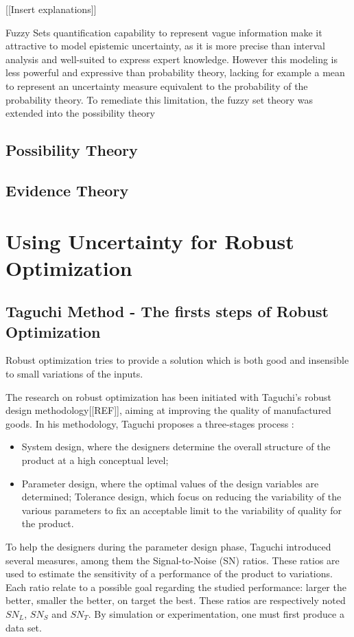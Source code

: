 [[Insert explanations]]

Fuzzy Sets quantification capability to represent vague information make it attractive to model epistemic uncertainty, as it is more precise than interval analysis and well-suited to express expert knowledge. However this modeling is less powerful and expressive than probability theory, lacking for example a mean to represent an uncertainty measure equivalent to the probability of the probability theory.
To remediate this limitation, the fuzzy set theory was extended into the possibility theory

\subsection{Possibility Theory}

\subsection{Evidence Theory}

\section{Using Uncertainty for Robust Optimization}

\subsection{Taguchi Method - The firsts steps of Robust Optimization }

Robust optimization tries to provide a solution which is both good and insensible to small variations of the inputs.

The research on robust optimization has been initiated with Taguchi's robust design methodology[[REF]], aiming at improving the quality of manufactured goods.
In his methodology, Taguchi proposes a three-stages process :
\begin{itemize}
\item System design, where the designers determine the overall structure of the product at a high conceptual level;
\item Parameter design, where the optimal values of the design variables are determined;
\tiem Tolerance design,  which focus on reducing the variability of the  various parameters to fix an acceptable limit to the variability of quality for the product.
\end{itemize}

To help the designers during the parameter design phase, Taguchi introduced several measures, among them the Signal-to-Noise (SN) ratios. These ratios are used to estimate the sensitivity of a performance of the product to variations. Each ratio relate to a possible goal regarding the studied performance: larger the better, smaller the better, on target the best. These ratios are respectively noted $SN_L$, $SN_S$ and $SN_T$.
By simulation or experimentation, one must first produce a data set.

